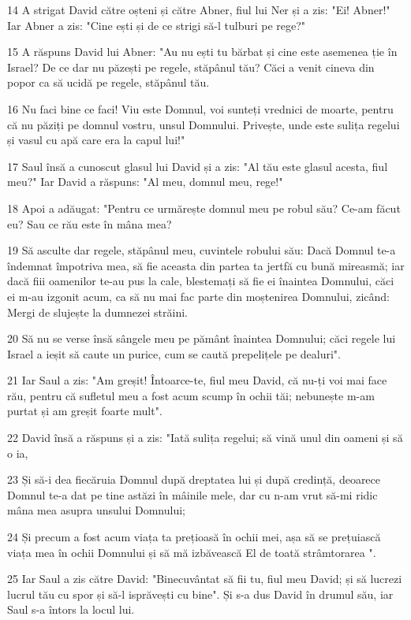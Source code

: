 \par 14 A strigat David către oșteni și către Abner, fiul lui Ner și a zis: "Ei! Abner!" Iar Abner a zis: "Cine ești și de ce strigi să-l tulburi pe rege?"
\par 15 A răspuns David lui Abner: "Au nu ești tu bărbat și cine este asemenea ție în Israel? De ce dar nu păzești pe regele, stăpânul tău? Căci a venit cineva din popor ca să ucidă pe regele, stăpânul tău.
\par 16 Nu faci bine ce faci! Viu este Domnul, voi sunteți vrednici de moarte, pentru că nu păziți pe domnul vostru, unsul Domnului. Privește, unde este sulița regelui și vasul cu apă care era la capul lui!"
\par 17 Saul însă a cunoscut glasul lui David și a zis: "Al tău este glasul acesta, fiul meu?" Iar David a răspuns: "Al meu, domnul meu, rege!"
\par 18 Apoi a adăugat: "Pentru ce urmărește domnul meu pe robul său? Ce-am făcut eu? Sau ce rău este în mâna mea?
\par 19 Să asculte dar regele, stăpânul meu, cuvintele robului său: Dacă Domnul te-a îndemnat împotriva mea, să fie aceasta din partea ta jertfă cu bună mireasmă; iar dacă fiii oamenilor te-au pus la cale, blestemați să fie ei înaintea Domnului, căci ei m-au izgonit acum, ca să nu mai fac parte din moștenirea Domnului, zicând: Mergi de slujește la dumnezei străini.
\par 20 Să nu se verse însă sângele meu pe pământ înaintea Domnului; căci regele lui Israel a ieșit să caute un purice, cum se caută prepelițele pe dealuri".
\par 21 Iar Saul a zis: "Am greșit! Întoarce-te, fiul meu David, că nu-ți voi mai face rău, pentru că sufletul meu a fost acum scump în ochii tăi; nebunește m-am purtat și am greșit foarte mult".
\par 22 David însă a răspuns și a zis: "Iată sulița regelui; să vină unul din oameni și să o ia,
\par 23 Și să-i dea fiecăruia Domnul după dreptatea lui și după credință, deoarece Domnul te-a dat pe tine astăzi în mâinile mele, dar cu n-am vrut să-mi ridic mâna mea asupra unsului Domnului;
\par 24 Și precum a fost acum viața ta prețioasă în ochii mei, așa să se prețuiască viața mea în ochii Domnului și să mă izbăvească El de toată strâmtorarea ".
\par 25 Iar Saul a zis către David: "Binecuvântat să fii tu, fiul meu David; și să lucrezi lucrul tău cu spor și să-l isprăvești cu bine". Și s-a dus David în drumul său, iar Saul s-a întors la locul lui.

